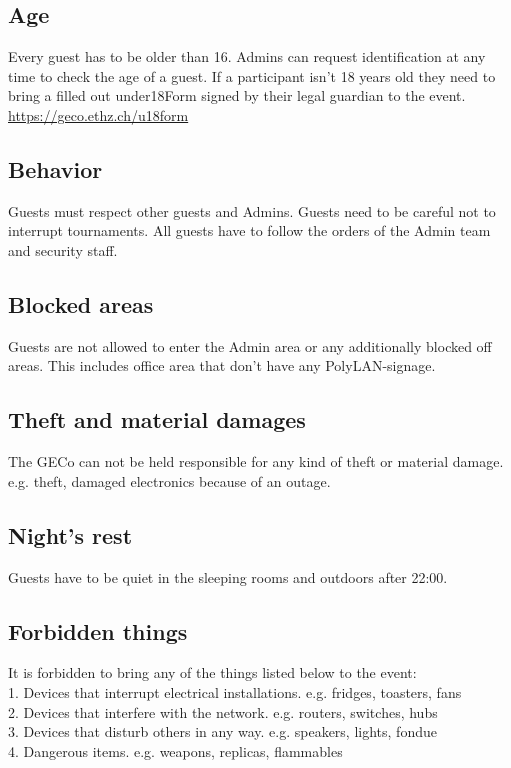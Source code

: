 \documentclass{article}
\begin{document}
\subsection{Age}
Every guest has to be older than 16. Admins can request identification at any time to check the age of a guest.
If a participant isn't 18 years old they need to bring a filled out under18Form signed by their legal guardian to the event. \url{https://geco.ethz.ch/u18form}

\subsection{Behavior}
Guests must respect other guests and Admins. Guests need to be careful not to interrupt tournaments. All guests have to follow the orders of the Admin team and security staff.

\subsection{Blocked areas}
Guests are not allowed to enter the Admin area or any additionally blocked off areas. This includes office area that don't have any PolyLAN-signage.

\subsection{Theft and material damages}
The GECo can not be held responsible for any kind of theft or material damage.\\ 
e.g. theft, damaged electronics because of an outage.

\subsection{Night's rest} 
Guests have to be quiet in the sleeping rooms and outdoors after 22:00.

\subsection{Forbidden things}
It is forbidden to bring any of the things listed below to the event:\\
1. Devices that interrupt electrical installations. e.g. fridges, toasters, fans\\
2. Devices that interfere with the network. e.g. routers, switches, hubs \\
3. Devices that disturb others in any way. e.g. speakers, lights, fondue\\
4. Dangerous items. e.g. weapons, replicas, flammables
\end{document}
